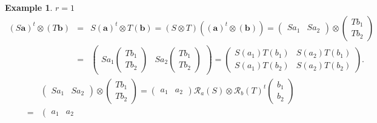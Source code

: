 \documentclass[aps,preprint]{revtex4}
\newtheorem{example}[theorem]{Example}
\begin{document}
\begin{example}
$r=1$%
\begin{eqnarray}
\left( S\boldsymbol{a}\right) ^{t}\otimes \left( T\boldsymbol{b}\right)
&=&S\left( \boldsymbol{a}\right) ^{t}\otimes T\left( \boldsymbol{b}\right)
=\left( S\otimes T\right) \left( \overset{}{\left( \boldsymbol{a}\right)
^{t}\otimes \left( \boldsymbol{b}\right) }\right) =\left( 
\begin{array}{cc}
Sa_{1} & Sa_{2}%
\end{array}%
\right) \otimes \left( 
\begin{array}{c}
Tb_{1} \\ 
Tb_{2}%
\end{array}%
\right) \\
&=&\left( 
\begin{array}{cc}
Sa_{1}\left( 
\begin{array}{c}
Tb_{1} \\ 
Tb_{2}%
\end{array}%
\right) & Sa_{2}\left( 
\begin{array}{c}
Tb_{1} \\ 
Tb_{2}%
\end{array}%
\right)%
\end{array}%
\right) =\left( 
\begin{array}{cc}
S\left( a_{1}\right) T\left( b_{1}\right) & S\left( a_{2}\right) T\left(
b_{1}\right) \\ 
S\left( a_{1}\right) T\left( b_{2}\right) & S\left( a_{2}\right) T\left(
b_{2}\right)%
\end{array}%
\right) .
\end{eqnarray}%
\begin{eqnarray}
&&\left( 
\begin{array}{cc}
Sa_{1} & Sa_{2}%
\end{array}%
\right) \otimes \left( 
\begin{array}{c}
Tb_{1} \\ 
Tb_{2}%
\end{array}%
\right) =\left( 
\begin{array}{cc}
a_{1} & a_{2}%
\end{array}%
\right) \mathcal{R}_{a}\left( S\right) \otimes \mathcal{R}_{b}\left(
T\right) ^{t}\left( 
\begin{array}{c}
b_{1} \\ 
b_{2}%
\end{array}%
\right) \\
&=&\left( 
\begin{array}{cc}
a_{1} & a_{2}%

\end{array}
\end{eqnarray}
\end{example}
\end{document}

